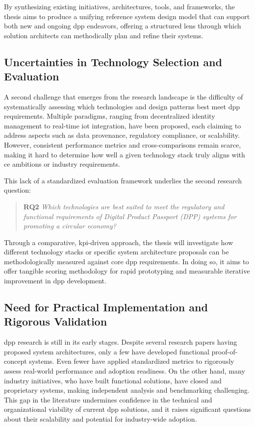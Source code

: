 By synthesizing existing initiatives, architectures, tools, and frameworks, the thesis aims to produce a unifying reference system design model that can support both new and ongoing \ac{dpp} endeavors, offering a structured lens through which solution architects can methodically plan and refine their systems.

\subsection*{Uncertainties in Technology Selection and Evaluation}
A second challenge that emerges from the research landscape is the difficulty of systematically assessing which technologies and design patterns best meet \ac{dpp} requirements. Multiple paradigms, ranging from decentralized identity management to real-time \ac{iot} integration, have been proposed, each claiming to address aspects such as data provenance, regulatory compliance, or scalability. However, consistent performance metrics and cross-comparisons remain scarce, making it hard to determine how well a given technology stack truly aligns with \acrlong{ce} ambitions or industry requirements.

This lack of a standardized evaluation framework underlies the second research question:

\begin{quote}
    \textbf{RQ2} \textit{Which technologies are best suited to meet the regulatory and functional requirements of Digital Product Passport (DPP) systems for promoting a circular economy?}
\end{quote}

Through a comparative, \ac{kpi}-driven approach, the thesis will investigate how different technology stacks or specific system architecture proposals can be methodologically measured against core \ac{dpp} requirements. In doing so, it aims to offer tangible scoring methodology for rapid prototyping and measurable iterative improvement in \ac{dpp} development.

\subsection*{Need for Practical Implementation and Rigorous Validation}
\ac{dpp} research is still in its early stages. Despite several research papers having proposed system architectures, only a few have developed functional proof-of-concept systems. Even fewer have applied standardized metrics to rigorously assess real-world performance and adoption readiness. On the other hand, many industry initiatives, who have built functional solutions, have closed and proprietary systems, making independent analysis and benchmarking challenging. This gap in the literature undermines confidence in the technical and organizational viability of current \ac{dpp} solutions, and it raises significant questions about their scalability and potential for industry-wide adoption.


